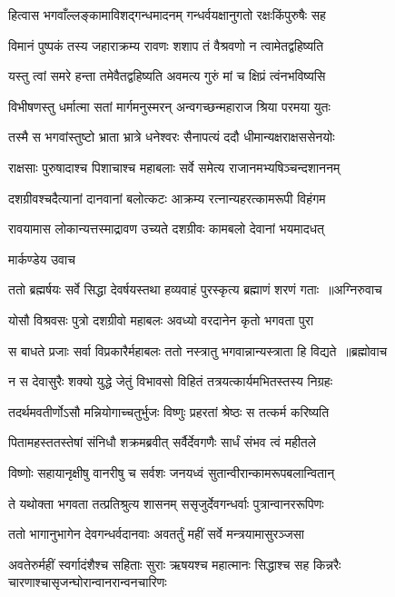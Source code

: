 \twolineshloka
{हित्वास भगवाँल्लङ्कामाविशद्गन्धमादनम्}
{गन्धर्वयक्षानुगतो रक्षःकिंपुरुषैः सह}


\twolineshloka
{विमानं पुष्पकं तस्य जहाराक्रम्य रावणः}
{शशाप तं वैश्रवणो न त्वामेतद्वहिष्यति}


\twolineshloka
{यस्तु त्वां समरे हन्ता तमेवैतद्वहिष्यति}
{अवमत्य गुरुं मां च क्षिप्रं त्वंनभविष्यसि}


\twolineshloka
{विभीषणस्तु धर्मात्मा सतां मार्गमनुस्मरन्}
{अन्वगच्छन्महाराज श्रिया परमया युतः}


\twolineshloka
{तस्मै स भगवांस्तुष्टो भ्राता भ्रात्रे धनेश्वरः}
{सैनापत्यं ददौ धीमान्यक्षराक्षससेनयोः}


\twolineshloka
{राक्षसाः पुरुषादाश्च पिशाचाश्च महाबलाः}
{सर्वे समेत्य राजानमभ्यषिञ्चन्दशाननम्}


\twolineshloka
{दशग्रीवश्चदैत्यानां दानवानां बलोत्कटः}
{आक्रम्य रत्नान्यहरत्कामरूपी विहंगम}


\twolineshloka
{रावयामास लोकान्यत्तस्माद्रावण उच्यते}
{दशग्रीवः कामबलो देवानां भयमादधत्}


\twolineshloka
{मार्कण्डेय उवाच}
{}


\threelineshloka
{ततो ब्रह्मर्षयः सर्वे सिद्धा देवर्षयस्तथा}
{हव्यवाहं पुरस्कृत्य ब्रह्माणं शरणं गताः ॥अग्निरुवाच}
{}


\twolineshloka
{योसौ विश्रवसः पुत्रो दशग्रीवो महाबलः}
{अवध्यो वरदानेन कृतो भगवता पुरा}


\threelineshloka
{स बाधते प्रजाः सर्वा विप्रकारैर्महाबलः}
{ततो नस्त्रातु भगवान्नान्यस्त्राता हि विद्यते ॥ब्रह्मोवाच}
{}


\twolineshloka
{न स देवासुरैः शक्यो युद्धे जेतुं विभावसो}
{विहितं तत्रयत्कार्यमभितस्तस्य निग्रहः}


\twolineshloka
{तदर्थमवतीर्णोऽसौ मन्नियोगाच्चतुर्भुजः}
{विष्णुः प्रहरतां श्रेष्ठः स तत्कर्म करिष्यति}



\twolineshloka
{पितामहस्ततस्तेषां संनिधौ शक्रमब्रवीत्}
{सर्वैर्देवगणैः सार्धं संभव त्वं महीतले}


\twolineshloka
{विष्णोः सहायानृक्षीषु वानरीषु च सर्वशः}
{जनयध्वं सुतान्वीरान्कामरूपबलान्वितान्}


\twolineshloka
{ते यथोक्ता भगवता तत्प्रतिश्रुत्य शासनम्}
{ससृजुर्देवगन्धर्वाः पुत्रान्वानररूपिणः}


\twolineshloka
{ततो भागानुभागेन देवगन्धर्वदानवाः}
{अवतर्तुं महीं सर्वे मन्त्रयामासुरञ्जसा}


\threelineshloka
{अवतेरुर्महीं स्वर्गादंशैश्च सहिताः सुराः}
{ऋषयश्च महात्मानः सिद्धाश्च सह किन्नरैः}
{चारणाश्चासृजन्घोरान्वानरान्वनचारिणः}


